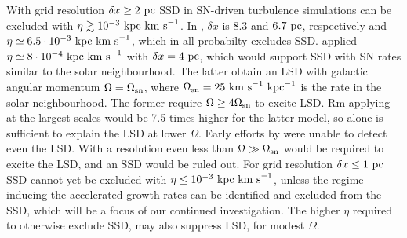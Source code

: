 \documentclass[preprint2]{aastex63}
\newcommand\OSN{\Omega_{\rm sn}}
\newcommand\kpc{~ {\rm kpc}}
\newcommand\pc{~ {\rm pc}}
\newcommand\dx{ {\delta x}}
\newcommand\kms{~ {\rm km~ s}^{-1}}
\begin{document}
With grid resolution $\dx\geq2\pc$ SSD in SN-driven turbulence simulations can be
excluded with $\eta\gtrsim10^{-3}\kpc\kms$.
In \citet{Gressel:2008,GE20}, $\dx$ is 8.3 and $6.7\pc$, respectively
and $\eta\simeq6.5\cdot10^{-3}\kpc\kms$, which in all probabilty excludes SSD.
\citet{Gent:2013b} applied $\eta\simeq8\cdot10^{-4}\kpc\kms$ with $\dx=4\pc$,
which would support SSD with SN rates similar to the solar neighbourhood.
The latter obtain an LSD with galactic angular momentum $\Omega=\OSN$, where
$\OSN=25\kms\kpc^{-1}$ is the rate in the solar neighbourhood.
The former require $\Omega\geq4\OSN$ to excite LSD.
Rm applying at the largest scales would be 7.5 times higher for the latter 
model, so alone is sufficient to explain the LSD at lower $\Omega$.
Early efforts by \citet{Korpi:1999b} were unable to detect even the LSD.
With a resolution even less than \citet{Gressel:2008} $\Omega\gg\OSN$ would be 
required to excite the LSD, and an SSD would be ruled out.
%
For grid resolution $\dx\leq1\pc$ SSD cannot yet be excluded with 
$\eta\leq10^{-3}\kpc\kms$, 
unless the regime inducing the accelerated growth rates can be identified
and excluded from the SSD, which will be a focus of our continued investigation.
The higher $\eta$ required to otherwise exclude SSD, may also suppress LSD, for
modest $\Omega$.
\end{document}
